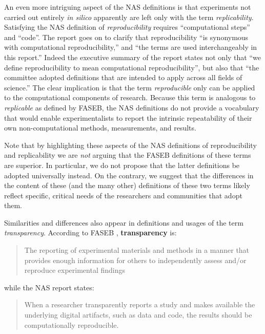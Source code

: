 An even more intriguing aspect of the NAS definitions \cite{committeeonreproducibilityandreplicabilityinscience2019reproducibility}
	is that experiments not carried out
	entirely \emph{in silico} apparently are left only with the term \emph{replicability}.
Satisfying the NAS definition of \emph{reproducibility} requires
	``computational steps'' and ``code''.  The report goes on to clarify
	that reproducibility ``is synonymous with computational reproducibility,''  and ``the terms are used interchangeably in this report.''
Indeed the executive summary of the report states not only that ``we define reproducibility to mean computational reproducibility'',
	but also that ``the committee adopted definitions that are intended to apply across all fields of science.''
The clear implication is that the term \emph{reproducible} only can be applied to the computational components of research.
Because this term is analogous to \emph{replicable} as defined by FASEB, the NAS definitions do not provide a vocabulary
	that would enable experimentalists to report the intrinsic repeatability of their own non-computational methods, measurements, and results.

Note that by highlighting these aspects of the NAS definitions
	of reproducibility and replicability we are \emph{not} arguing
 	that the FASEB definitions of these terms are superior.
In particular, we do not propose that the latter definitions be adopted universally instead.
On the contrary, we suggest that the differences in the content of these (and the many other) definitions
of these two terms likely reflect specific, critical needs of the researchers and communities that adopt them.

Similarities and differences also appear in definitions and usages of the term \emph{transparency}.
According to FASEB \cite{FASEB2016enhancing}, \textbf{transparency} is:
\begin{quote}
	The reporting of experimental materials and methods in a manner that provides enough information
	for others to independently assess and/or reproduce experimental findings
      \end{quote}
while the NAS report \cite{committeeonreproducibilityandreplicabilityinscience2019reproducibility} states:
 \begin{quote}
	When a researcher transparently reports a study and makes available the underlying digital artifacts, such as data and code,
	the results should be computationally reproducible.
      \end{quote}

